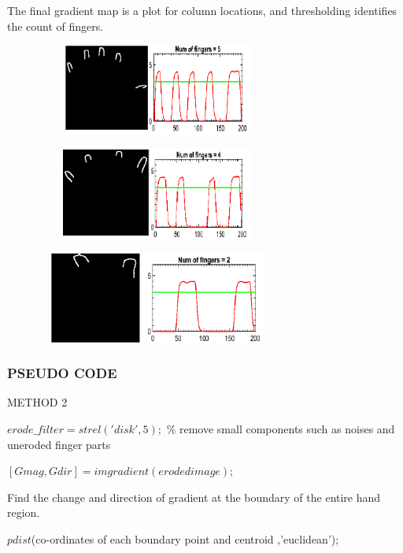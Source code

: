 \documentclass[conference]{IEEEtran}
\begin{document}
The final gradient map is a plot for column locations, and thresholding identifies the count of fingers.

\begin{figure}[h!]
	\centering
	\includegraphics[width = 8cm, height = 3cm]{fin5m2}
\end{figure}

\begin{figure}[h!]
	\centering
	\includegraphics[width = 8cm, height = 3cm]{fin4m2}
\end{figure}

\begin{figure}[h!]
	\centering
	\includegraphics[width = 8cm, height = 3cm]{fin2m2}
\end{figure}

\subsubsection{PSEUDO CODE}
METHOD 2

$erode\_filter= strel('disk',5);$ \% remove small components such as noises and uneroded finger parts
 
$[Gmag, Gdir] = imgradient(eroded image); $

Find the change and direction of gradient at the boundary of the entire hand region. 

$pdist$(co-ordinates of each boundary point and centroid ,'euclidean');
\end{document}

